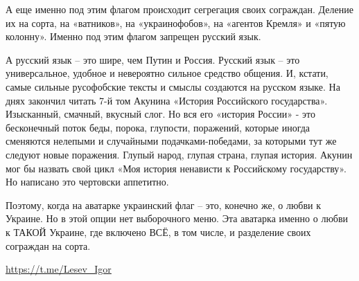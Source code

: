А еще именно под этим флагом происходит сегрегация своих сограждан. Деление их
на сорта, на «ватников», на «украинофобов», на «агентов Кремля» и «пятую
колонну». Именно под этим флагом запрещен русский язык.

А русский язык – это шире, чем Путин и Россия. Русский язык – это
универсальное, удобное и невероятно сильное средство общения. И, кстати, самые
сильные русофобские тексты и смыслы создаются на русском языке. На днях
закончил читать 7-й том Акунина «История Российского государства». Изысканный,
смачный, вкусный слог. Но вся его «история России» - это бесконечный поток
беды, порока, глупости, поражений, которые иногда сменяются нелепыми и
случайными подачками-победами, за которыми тут же следуют новые поражения.
Глупый народ, глупая страна, глупая история. Акунин мог бы назвать свой цикл
«Моя история ненависти к Российскому государству». Но написано это чертовски
аппетитно.

Поэтому, когда на аватарке украинский флаг – это, конечно же, о любви к
Украине. Но в этой опции нет выборочного меню. Эта аватарка именно о любви к
ТАКОЙ Украине, где включено ВСЁ, в том числе, и разделение своих сограждан на
сорта.

\url{https://t.me/Lesev_Igor}


